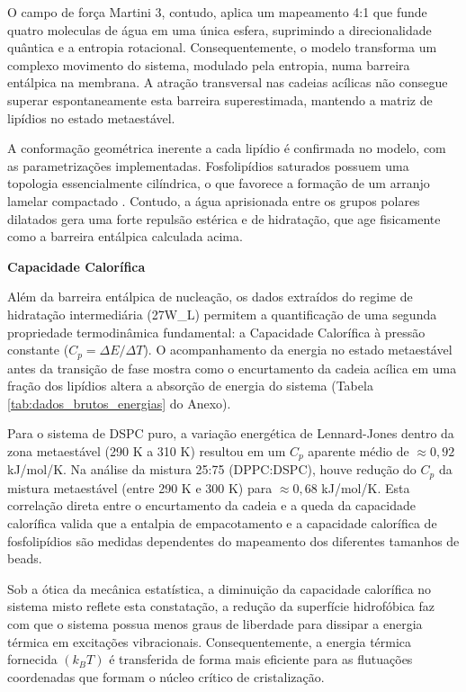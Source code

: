 O campo de força Martini 3, contudo, aplica um mapeamento 4:1 que funde quatro moleculas de água em uma única esfera, suprimindo a direcionalidade quântica e a entropia rotacional.  Consequentemente, o modelo transforma um complexo movimento do sistema, modulado pela entropia, numa barreira entálpica na membrana. A atração transversal nas cadeias acílicas não consegue superar espontaneamente esta barreira superestimada, mantendo a matriz de lipídios no estado metaestável.

A conformação geométrica inerente a cada lipídio é confirmada no modelo, com as parametrizações implementadas. Fosfolipídios saturados possuem uma topologia essencialmente cilíndrica, o que favorece a formação de um arranjo lamelar compactado \cite{lee2022}. Contudo, a água aprisionada entre os grupos polares dilatados gera uma forte repulsão estérica e de hidratação, que age fisicamente como a barreira entálpica calculada acima.

\vspace{1em}
\noindent\textbf{Capacidade Calorífica}

Além da barreira entálpica de nucleação, os dados extraídos do regime de hidratação intermediária (27W\_L) permitem a quantificação de uma segunda propriedade termodinâmica fundamental: a Capacidade Calorífica à pressão constante ($C_p = \Delta E / \Delta T$). O acompanhamento da energia no estado metaestável antes da transição de fase mostra como o encurtamento da cadeia acílica em uma fração dos lipídios altera a absorção de energia do sistema (Tabela \ref{tab:dados_brutos_energias} do Anexo).

Para o sistema de DSPC puro, a variação energética de Lennard-Jones dentro da zona metaestável (290 K a 310 K) resultou em um $C_p$ aparente médio de $\approx 0,92$ kJ/mol/K. Na análise da mistura 25:75 (DPPC:DSPC), houve redução do $C_p$ da mistura metaestável (entre 290 K e 300 K) para $\approx 0,68$ kJ/mol/K. Esta correlação direta entre o encurtamento da cadeia e a queda da capacidade calorífica valida que a entalpia de empacotamento e a capacidade calorífica de fosfolipídios são medidas dependentes do mapeamento dos diferentes tamanhos de beads. 

Sob a ótica da mecânica estatística, a diminuição da capacidade calorífica no sistema misto reflete esta constatação, a redução da superfície hidrofóbica faz com que o sistema possua menos graus de liberdade para dissipar a energia térmica em excitações vibracionais. Consequentemente, a energia térmica fornecida $(k_B T)$ é transferida de forma mais eficiente para as flutuações coordenadas que formam o núcleo crítico de cristalização.

